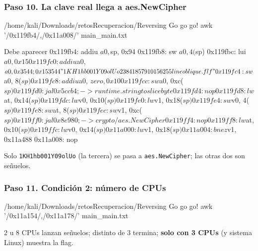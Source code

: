 \documentclass[11pt,a4paper]{article}
\begin{document}
\subsubsection*{Paso 10. La clave real llega a aes.NewCipher}
\begin{comando}{/home/kali/Downloads/retosRecuperacion/Reversing Go go go!}
awk '/0x119fb4/,/0x11a008/' main_main.txt
\end{comando}
\begin{salida}{Debe aparecer}
0x119fb4: addiu    $a0, $sp, 0x94
0x119fb8: sw       $a0, 4($sp)
0x119fbc: lui      $a0, 0x15
0x119fc0: addiu    $a0, $a0, 0x3544  ; 0x153544 "1KH1hb001Y09olUo23841857910156255lineoblique.flf"
0x119fc4: sw       $a0, 8($sp)
0x119fc8: addiu    $a0, $zero, 0x10
0x119fcc: sw       $a0, 0xc($sp)
0x119fd0: jal      0x5ccb4  ; -> runtime.stringtoslicebyte
0x119fd4: nop      
0x119fd8: lw       $at, 0x14($sp)
0x119fdc: lw       $v0, 0x10($sp)
0x119fe0: lw       $v1, 0x18($sp)
0x119fe4: sw       $v0, 4($sp)
0x119fe8: sw       $at, 8($sp)
0x119fec: sw       $v1, 0xc($sp)
0x119ff0: jal      0x8e980  ; -> crypto/aes.NewCipher
0x119ff4: nop      
0x119ff8: lw       $at, 0x10($sp)
0x119ffc: lw       $v0, 0x14($sp)
0x11a000: lw       $v1, 0x18($sp)
0x11a004: bnez     $v1, 0x11a488
0x11a008: nop      
\end{salida}
\begin{nota}Solo \texttt{1KH1hb001Y09olUo} (la tercera) se pasa a \texttt{aes.NewCipher}; las otras dos son señuelos.\end{nota}

\subsubsection*{Paso 11. Condición 2: número de CPUs}
\begin{comando}{/home/kali/Downloads/retosRecuperacion/Reversing Go go go!}
awk '/0x11a154/,/0x11a178/' main_main.txt
\end{comando}
\begin{nota}2 u 8 CPUs lanzan señuelos; distinto de 3 termina; \textbf{solo con 3 CPUs} (y sistema Linux) muestra la flag.\end{nota}
\end{document}

